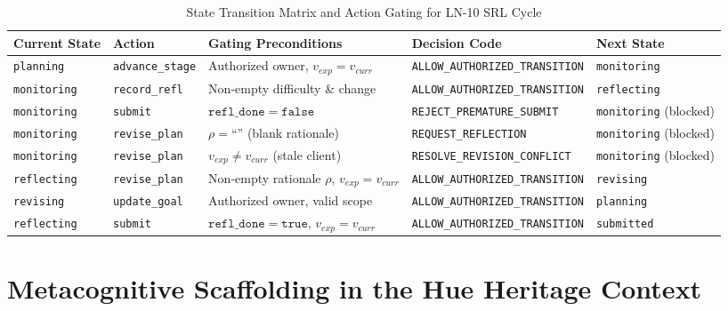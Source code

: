 \documentclass[11pt,a4paper]{article}
\begin{document}
\begin{table}[htbp]
\centering
\small
\caption{State Transition Matrix and Action Gating for LN-10 SRL Cycle}
\label{tab:transition-matrix}
\begin{tabularx}{\textwidth}{llp{3.2cm}p{3.5cm}X}
\toprule
\textbf{Current State} & \textbf{Action} & \textbf{Gating Preconditions} & \textbf{Decision Code} & \textbf{Next State} \\
\midrule
\texttt{planning} & \texttt{advance\_stage} & Authorized owner, $v_{exp}=v_{curr}$ & \texttt{ALLOW\_AUTHORIZED\_TRANSITION} & \texttt{monitoring} \\
\texttt{monitoring} & \texttt{record\_refl} & Non-empty difficulty \& change & \texttt{ALLOW\_AUTHORIZED\_TRANSITION} & \texttt{reflecting} \\
\texttt{monitoring} & \texttt{submit} & $\mathtt{refl\_done} = \mathtt{false}$ & \texttt{REJECT\_PREMATURE\_SUBMIT} & \texttt{monitoring} (blocked) \\
\texttt{monitoring} & \texttt{revise\_plan} & $\rho = \text{``''}$ (blank rationale) & \texttt{REQUEST\_REFLECTION} & \texttt{monitoring} (blocked) \\
\texttt{monitoring} & \texttt{revise\_plan} & $v_{exp} \neq v_{curr}$ (stale client) & \texttt{RESOLVE\_REVISION\_CONFLICT} & \texttt{monitoring} (blocked) \\
\texttt{reflecting} & \texttt{revise\_plan} & Non-empty rationale $\rho$, $v_{exp}=v_{curr}$ & \texttt{ALLOW\_AUTHORIZED\_TRANSITION} & \texttt{revising} \\
\texttt{revising} & \texttt{update\_goal} & Authorized owner, valid scope & \texttt{ALLOW\_AUTHORIZED\_TRANSITION} & \texttt{planning} \\
\texttt{reflecting} & \texttt{submit} & $\mathtt{refl\_done} = \mathtt{true}$, $v_{exp}=v_{curr}$ & \texttt{ALLOW\_AUTHORIZED\_TRANSITION} & \texttt{submitted} \\
\bottomrule
\end{tabularx}
\end{table}

\section{Metacognitive Scaffolding in the Hue Heritage Context}
\end{document}
